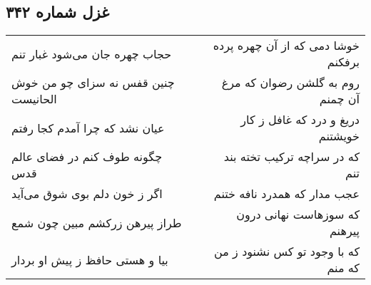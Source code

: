 \begin{center}
\section*{غزل شماره ۳۴۲}
\label{sec:sh342}
\begin{longtable}{l p{0.5cm} r}
حجاب چهره جان می‌شود غبار تنم
&&
خوشا دمی که از آن چهره پرده برفکنم
\\
چنین قفس نه سزای چو من خوش الحانیست
&&
روم به گلشن رضوان که مرغ آن چمنم
\\
عیان نشد که چرا آمدم کجا رفتم
&&
دریغ و درد که غافل ز کار خویشتنم
\\
چگونه طوف کنم در فضای عالم قدس
&&
که در سراچه ترکیب تخته بند تنم
\\
اگر ز خون دلم بوی شوق می‌آید
&&
عجب مدار که همدرد نافه ختنم
\\
طراز پیرهن زرکشم مبین چون شمع
&&
که سوزهاست نهانی درون پیرهنم
\\
بیا و هستی حافظ ز پیش او بردار
&&
که با وجود تو کس نشنود ز من که منم
\\
\end{longtable}
\end{center}
